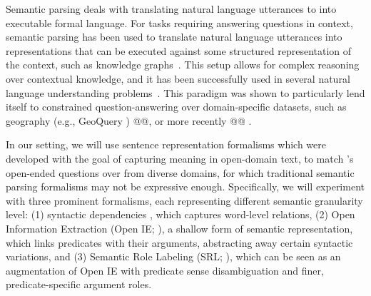 
Semantic parsing deals with translating natural language utterances to
into executable formal language. For tasks requiring answering questions in context, semantic parsing
has been used to translate natural language utterances into representations that can be
executed against some structured representation of the context, such as knowledge
graphs~\citep[among others]{Zettlemoyer2005LearningTM,berant2013semantic,Yin2017ASN,chen2011learning}.
This setup allows for complex reasoning over contextual knowledge, and it has
been successfully used in several natural language understanding
problems~\citep[among others]{}.
This paradigm was shown to particularly lend itself to constrained question-answering
over domain-specific datasets, such as geography (e.g., GeoQuery \cite{geoquery})
@@, or more recently @@ .

In our setting, we will use sentence representation formalisms which were
developed with the goal of capturing meaning in open-domain text, to match \drop's
open-ended questions over from diverse domains,
for which traditional semantic parsing formalisms may not be expressive enough.
Specifically, we will experiment with three prominent formalisms, each
representing different semantic granularity level:
(1) syntactic dependencies \cite{sd}, which captures word-level relations, 
(2) Open Information Extraction (Open IE; \cite{oie}), a shallow
form of semantic representation, which links predicates
with their arguments, abstracting away certain syntactic variations, and
(3) Semantic Role Labeling (SRL; \cite{srl}), which can be seen as an
augmentation of Open IE with predicate sense disambiguation and finer, predicate-specific
argument roles.

